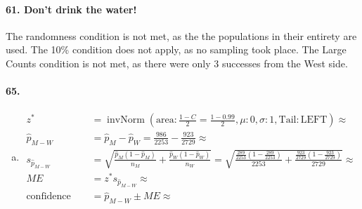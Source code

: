 \documentclass[12pt, A4]{article}
\DeclareMathOperator{\invNorm}{invNorm}
\newcommand{\invNormal}[4]{\invNorm\left(\mathrm{area}:#1, \mu: #2, \sigma: #3, \mathrm{Tail: #4}\right)}
\newcommand{\propsed}[4]{\sqrt{\frac{#1\left(1 - #1\right)}{#2} + \frac{#3\left(1 - #3\right)}{#4}}}
\begin{document}
		\paragraph{61. Don't drink the water!}
			The randomness condition is not met, as the the populations in their entirety are used.
			The 10\% condition does not apply, as no sampling took place.
			The Large Counts condition is not met, as there were only 3 successes from the West side.
			\paragraph{65. }
				\begin{enumerate}[a.] 
					\item
						\begin{align*}
							z^* &= \invNormal{\frac{1 - C}{2} = \frac{1 - 0.99}{2}}{0}{1}{LEFT} \approx \\
							\hat{p}_{M - W} &= \hat{p}_M - \hat{p}_W = \frac{986}{2253} - \frac{923}{2729} \approx \\ s_{\hat{p}_{M - W}} &= \propsed{\hat{p}_M}{n_M}{\hat{p}_W}{n_W} = \propsed{\frac{289}{2253}}{2253}{\frac{923}{2729}}{2729} \approx \\
							ME &= z^*s_{\hat{p}_{M - W}} \approx \\
							\text{confidence interval} &= \hat{p}_{M - W} \pm ME \approx 
						\end{align*}
				\end{enumerate}
\end{document}
